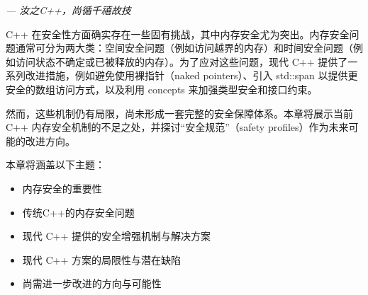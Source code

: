 \begin{flushright}
\textit{--- 汝之C++，尚循千禧故技}
\end{flushright}

C++ 在安全性方面确实存在一些固有挑战，其中内存安全尤为突出。内存安全问题通常可分为两大类：空间安全问题（例如访问越界的内存）和时间安全问题（例如访问状态不确定或已被释放的内存）。为了应对这些问题，现代 C++ 提供了一系列改进措施，例如避免使用裸指针（naked pointers）、引入 std::span 以提供更安全的数组访问方式，以及利用 concepts 来加强类型安全和接口约束。

然而，这些机制仍有局限，尚未形成一套完整的安全保障体系。本章将展示当前 C++ 内存安全机制的不足之处，并探讨“安全规范”（safety profiles）作为未来可能的改进方向。

本章将涵盖以下主题：

\begin{itemize}
\item 
内存安全的重要性

\item 
传统C++的内存安全问题

\item 
现代 C++ 提供的安全增强机制与解决方案

\item 
现代 C++ 方案的局限性与潜在缺陷

\item 
尚需进一步改进的方向与可能性
\end{itemize}














